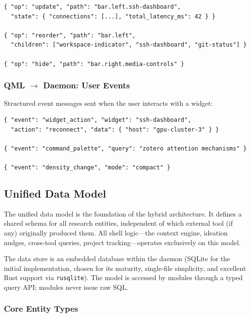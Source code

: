 \documentclass[11pt,a4paper]{article}
\begin{document}
\begin{lstlisting}[language={}]
{ "op": "update", "path": "bar.left.ssh-dashboard",
  "state": { "connections": [...], "total_latency_ms": 42 } }

{ "op": "reorder", "path": "bar.left",
  "children": ["workspace-indicator", "ssh-dashboard", "git-status"] }

{ "op": "hide", "path": "bar.right.media-controls" }
\end{lstlisting}

\subsubsection{QML $\to$ Daemon: User Events}
Structured event messages sent when the user interacts with a widget:

\begin{lstlisting}[language={}]
{ "event": "widget_action", "widget": "ssh-dashboard",
  "action": "reconnect", "data": { "host": "gpu-cluster-3" } }

{ "event": "command_palette", "query": "zotero attention mechanisms" }

{ "event": "density_change", "mode": "compact" }
\end{lstlisting}

\subsection{Unified Data Model}
\label{sec:data-model}

The unified data model is the foundation of the hybrid architecture. It defines a shared schema for all research entities, independent of which external tool (if any) originally produced them. All shell logic---the context engine, ideation nudges, cross-tool queries, project tracking---operates exclusively on this model.

The data store is an embedded database within the daemon (SQLite for the initial implementation, chosen for its maturity, single-file simplicity, and excellent Rust support via \texttt{rusqlite}). The model is accessed by modules through a typed query API; modules never issue raw SQL.

\subsubsection{Core Entity Types}
\end{document}

